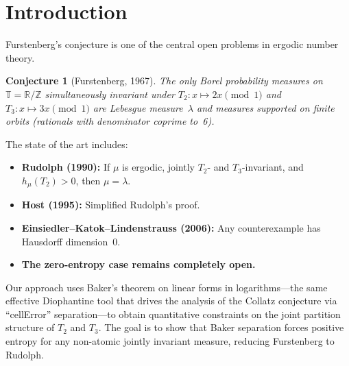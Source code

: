 \documentclass[11pt,a4paper]{article}
\newtheorem{conjecture}{Conjecture}
\begin{document}
\begin{abstract}
\emph{Phase~2c (Joint constraints):}
We build the combined $T_2 + T_3$ constraint matrix across 2--3 consecutive
dyadic scales (up to $9216 \times 9216$ at $j = 10$) and compute exact
rank formulas via Gaussian elimination:
$\operatorname{rank} = 7N - 1$ (2-scale) or $17N - 1$ (3-scale),
with $T_2$-invariance killing exactly $N_{\text{finest}}$ degrees of freedom.
However, the atom-mass DOF at the coarsest scale remains $N/2 + 1$, showing
that the linear constraint system alone does not force $\mathbf{T}p = p$.
This identifies \emph{positivity} ($w_{k,s} \ge 0$) as the essential
non-linear ingredient for the entropy bridge, consistent with the structure
of Rudolph's theorem.
\end{abstract}


\section{Introduction}

Furstenberg's conjecture \cite{furstenberg1967} is one of the central
open problems in ergodic number theory.

\begin{conjecture}[Furstenberg, 1967]
The only Borel probability measures on $\mathbb{T} = \mathbb{R}/\mathbb{Z}$
simultaneously invariant under $T_2\colon x \mapsto 2x \pmod{1}$ and
$T_3\colon x \mapsto 3x \pmod{1}$ are Lebesgue measure~$\lambda$ and
measures supported on finite orbits (rationals with denominator coprime to~6).
\end{conjecture}

The state of the art includes:
\begin{itemize}
\item \textbf{Rudolph (1990):} If $\mu$ is ergodic, jointly $T_2$- and
  $T_3$-invariant, and $h_\mu(T_2) > 0$, then $\mu = \lambda$.
\item \textbf{Host (1995):} Simplified Rudolph's proof.
\item \textbf{Einsiedler--Katok--Lindenstrauss (2006):} Any
  counterexample has Hausdorff dimension~0.
\item \textbf{The zero-entropy case remains completely open.}
\end{itemize}

Our approach uses Baker's theorem on linear forms in logarithms---the
same effective Diophantine tool that drives the analysis of the Collatz
conjecture via ``cellError'' separation---to obtain quantitative
constraints on the joint partition structure of $T_2$ and $T_3$.
The goal is to show that Baker separation forces positive entropy for
any non-atomic jointly invariant measure, reducing Furstenberg to Rudolph.
\end{document}
